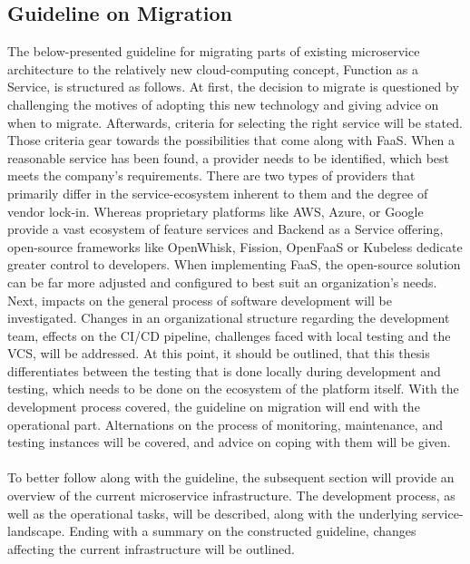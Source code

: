 \documentclass[a4paper,twoside,11pt, pagesize]{scrartcl}
\begin{document}
\begin{spacing}{1.2}
\newpage





\section{Guideline on Migration}
The below-presented guideline for migrating parts of existing microservice architecture to the relatively new cloud-computing concept, Function as a Service, is structured as follows. At first, the decision to migrate is questioned by challenging the motives of adopting this new technology and giving advice on when to migrate. Afterwards, criteria for selecting the right service will be stated. Those criteria gear towards the possibilities that come along with FaaS. When a reasonable service has been found, a provider needs to be identified, which best meets the company's requirements. There are two types of providers that primarily differ in the service-ecosystem inherent to them and the degree of vendor lock-in. Whereas proprietary platforms like AWS, Azure, or Google provide a vast ecosystem of feature services and Backend as a Service offering, open-source frameworks like OpenWhisk, Fission, OpenFaaS or Kubeless dedicate greater control to developers. When implementing FaaS, the open-source solution can be far more adjusted and configured to best suit an organization's needs. Next, impacts on the general process of software development will be investigated. Changes in an organizational structure regarding the development team, effects on the CI/CD pipeline, challenges faced with local testing and the VCS, will be addressed. At this point, it should be outlined, that this thesis differentiates between the testing that is done locally during development and testing, which needs to be done on the ecosystem of the platform itself. With the development process covered, the guideline on migration will end with the operational part. Alternations on the process of monitoring, maintenance, and testing instances will be covered, and advice on coping with them will be given.\\\\ To better follow along with the guideline, the subsequent section will provide an overview of the current microservice infrastructure. The development process, as well as the operational tasks, will be described, along with the underlying service-landscape. Ending with a summary on the constructed guideline, changes affecting the current infrastructure will be outlined.

\end{spacing}
\end{document}
